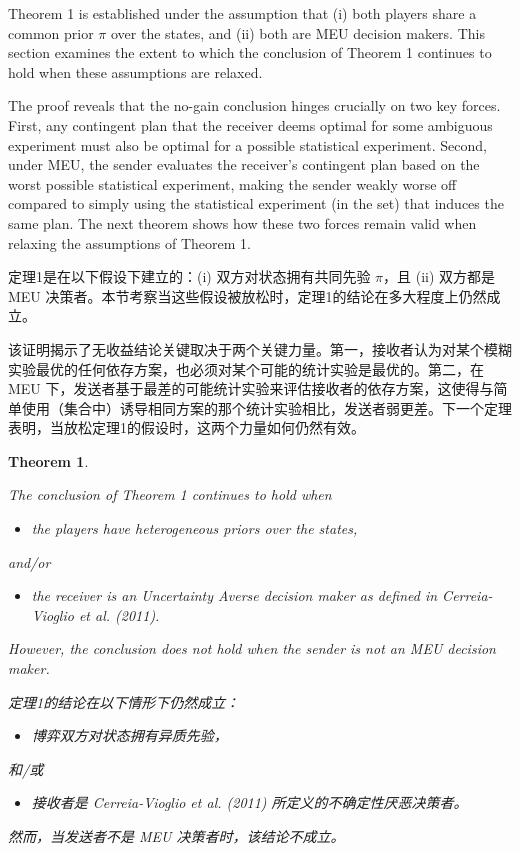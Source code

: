 \documentclass[12pt,a4paper]{article}
\newtheorem{theorem}{Theorem}[section]
\theoremstyle{definition}
\theoremstyle{remark}
\newenvironment{original}{%
    \par\medskip\noindent%
    \begin{tcolorbox}[%
        colback=white,%
        colframe=black!50,%
        title=\textbf{Original English},%
        fonttitle=\small\bfseries,%
        left=0pt, right=0pt, top=2pt, bottom=2pt,%
        boxrule=0.5pt,%
        arc=0pt,%
        outer arc=0pt%
    ]%
    \small%
}{%
    \end{tcolorbox}%
}
\newenvironment{translation}{%
    \par\smallskip\noindent%
    \begin{tcolorbox}[%
        colback=blue!3!white,%
        colframe=blue!40!black,%
        title=\textbf{中文翻译},%
        fonttitle=\small\bfseries,%
        left=0pt, right=0pt, top=2pt, bottom=2pt,%
        boxrule=0.5pt,%
        arc=0pt,%
        outer arc=0pt%
    ]%
    \small\color{blue!60!black}%
}{%
    \end{tcolorbox}\medskip%
}
\begin{document}
\begin{original}
Theorem 1 is established under the assumption that (i) both players share a common prior $\pi$ over the states, and (ii) both are MEU decision makers. This section examines the extent to which the conclusion of Theorem 1 continues to hold when these assumptions are relaxed.

The proof reveals that the no-gain conclusion hinges crucially on two key forces. First, any contingent plan that the receiver deems optimal for some ambiguous experiment must also be optimal for a possible statistical experiment. Second, under MEU, the sender evaluates the receiver's contingent plan based on the worst possible statistical experiment, making the sender weakly worse off compared to simply using the statistical experiment (in the set) that induces the same plan. The next theorem shows how these two forces remain valid when relaxing the assumptions of Theorem 1.
\end{original}
\begin{translation}
定理1是在以下假设下建立的：(i) 双方对状态拥有共同先验 $\pi$，且 (ii) 双方都是 MEU 决策者。本节考察当这些假设被放松时，定理1的结论在多大程度上仍然成立。

该证明揭示了无收益结论关键取决于两个关键力量。第一，接收者认为对某个模糊实验最优的任何依存方案，也必须对某个可能的统计实验是最优的。第二，在 MEU 下，发送者基于最差的可能统计实验来评估接收者的依存方案，这使得与简单使用（集合中）诱导相同方案的那个统计实验相比，发送者弱更差。下一个定理表明，当放松定理1的假设时，这两个力量如何仍然有效。
\end{translation}

\begin{theorem}\label{thm:2}
\begin{original}
The conclusion of Theorem 1 continues to hold when
\begin{itemize}
    \item[(i)] the players have heterogeneous priors over the states,
\end{itemize}
and/or
\begin{itemize}
    \item[(ii)] the receiver is an Uncertainty Averse decision maker as defined in Cerreia-Vioglio et al. (2011).
\end{itemize}
However, the conclusion does not hold when the sender is not an MEU decision maker.
\end{original}
\begin{translation}
定理1的结论在以下情形下仍然成立：
\begin{itemize}
    \item[(i)] 博弈双方对状态拥有异质先验，
\end{itemize}
和/或
\begin{itemize}
    \item[(ii)] 接收者是 Cerreia-Vioglio et al. (2011) 所定义的不确定性厌恶决策者。
\end{itemize}
然而，当发送者不是 MEU 决策者时，该结论不成立。
\end{translation}
\end{theorem}
\end{document}
